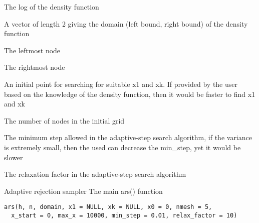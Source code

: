 \documentclass[a4paper]{book}
\begin{document}
\begin{Arguments}
\begin{ldescription}
\item[\code{h}] The log of the density function

\item[\code{domain}] A vector of length 2 giving the domain (left bound, right bound) of the density function

\item[\code{x1}] The leftmost node

\item[\code{xk}] The rightmost node

\item[\code{x0}] An initial point for searching for suitable x1 and xk. If provided by the user based on the knowledge of the density function, then it would be faster to find x1 and xk

\item[\code{nmesh}] The number of nodes in the initial grid

\item[\code{min\_step}] The minimum step allowed in the adaptive-step search algorithm, if the variance is extremely small, then the used can decrease the min\_step, yet it would be slower

\item[\code{relax\_factor}] The relaxation factor in the adaptive-step search algorithm
\end{ldescription}
\end{Arguments}
%
\begin{Description}\relax
Adaptive rejection sampler
The main ars() function
\end{Description}
%
\begin{Usage}
\begin{verbatim}
ars(h, n, domain, x1 = NULL, xk = NULL, x0 = 0, nmesh = 5,
  x_start = 0, max_x = 10000, min_step = 0.01, relax_factor = 10)
\end{verbatim}
\end{Usage}
%
\end{document}

